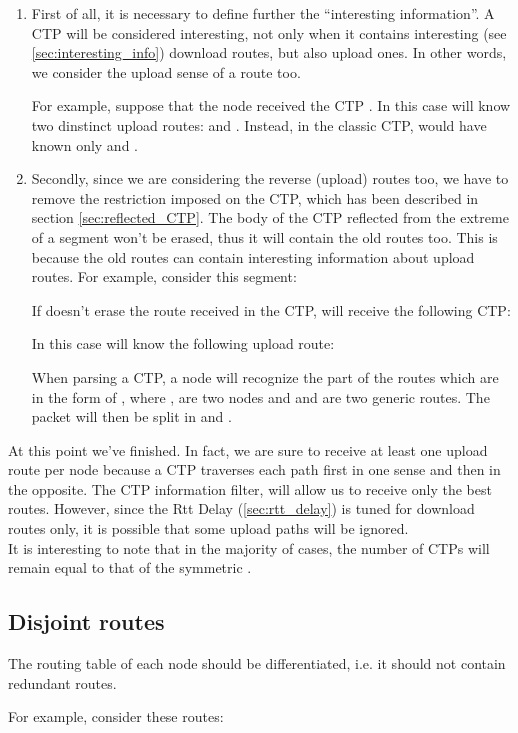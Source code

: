 \documentclass[a4paper]{article}
\begin{document}
\begin{enumerate}
	\item	First of all, it is necessary to define further the ``interesting
		information''. A CTP will be considered interesting, not only when it contains
		interesting (see \ref{sec:interesting_info}) download routes, but also upload
		ones. In other words, we consider the upload sense of a route too. 

		For example, suppose that the node  received the CTP . In this
		case  will know two dinstinct upload routes:  and . Instead, in
		the classic CTP,  would have known only  and .
	\item Secondly, since we are considering the reverse (upload) routes
		too, we have to remove the restriction imposed on the CTP,
		which has been described in section \ref{sec:reflected_CTP}.
                The body of the CTP reflected from the extreme of a segment
                won't be erased, thus it will contain the old routes too.
		This is because the old routes can contain interesting
		information about upload routes.
		For example, consider this segment:
		
		If  doesn't erase the route received in the CTP,  will
		receive the following CTP:
		
		In this case  will know the following upload route:
		
		When parsing a CTP, a node will recognize the part of the
		routes which are in the form of , where ,  are
		two nodes and  and  are two generic routes. The packet
		will then be split in  and .
\end{enumerate}
At this point we've finished. In fact, we are sure to receive at least one
upload route per node because a CTP traverses each path first in one sense
and then in the opposite. The CTP information filter, will allow us
to receive only the best routes. However, since the Rtt Delay
(\ref{sec:rtt_delay}) is tuned for download routes only, it is possible that
some upload paths will be ignored.\\
It is interesting to note that in the majority of cases, the number of
CTPs will remain equal to that of the symmetric .

\subsection{Disjoint routes}
The routing table of each node should be differentiated, i.e. it should not
contain redundant routes.

For example, consider these  routes:
\end{document}
